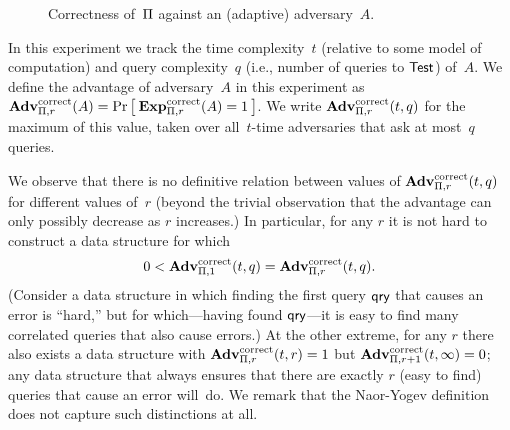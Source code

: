 \begin{figure}[bt]
\centering
{}
\caption{Correctness of~$\Pi$ against an (adaptive) adversary~$A$.}
\label{fig:correctness}
\end{figure}


In this experiment we track the time complexity~$t$ (relative to some
model of computation) and query complexity~$q$ (i.e., number of
queries to $\mathsf{Test}$) of~$A$.
We define the advantage of adversary~$A$ in this experiment as
$\mathrm{\mathbf{Adv}}^{\mathrm{correct}}_{\Pi,r}(A) = \Pr\left[\: \mathrm{\mathbf{Exp}}^{\mathrm{correct}}_{\Pi,r}(A)=1 \:\right]$.
We write $\mathrm{\mathbf{Adv}}^{\mathrm{correct}}_{\Pi,r}(t,q)$ for the maximum of this value, taken over
all~$t$-time adversaries that ask at most~$q$ queries.

We observe that there is no definitive relation between
values of $\mathrm{\mathbf{Adv}}^{\mathrm{correct}}_{\Pi,r}(t,q)$ for different values of~$r$ (beyond
the trivial observation that the advantage can only possibly decrease as $r$ increases.)
In particular, for any $r$ it is not hard to construct a data structure
for which
\[0 < \mathrm{\mathbf{Adv}}^{\mathrm{correct}}_{\Pi,1}(t,q) = \mathrm{\mathbf{Adv}}^{\mathrm{correct}}_{\Pi,r}(t,q).\]
(Consider a data structure in which finding the first query $\mathsf{qry}$ that causes an error
is ``hard,'' but for which---having found $\mathsf{qry}$---it is easy to find
many correlated queries that also cause errors.)
At the other extreme, for any $r$ there also exists a data structure
with $\mathrm{\mathbf{Adv}}^{\mathrm{correct}}_{\Pi,r}(t,r)=1$ but  $\mathrm{\mathbf{Adv}}^{\mathrm{correct}}_{\Pi,r+1}(t,\infty)=0$;
any data structure that always ensures that there are exactly $r$ (easy to find)
queries that cause an error will~do. 
We remark that the Naor-Yogev definition does not capture such distinctions
at all.

